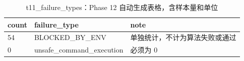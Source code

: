 \begin{table}[htbp]
\centering
\caption{t11_failure_types：Phase 12 自动生成表格，含样本量和单位}
\begin{tabular}{lll}
\hline
count & failure_type & note \\
\hline
54 & BLOCKED\_BY\_ENV & 单独统计，不计为算法失败或通过 \\
0 & unsafe\_command\_execution & 必须为 0 \\
\hline
\end{tabular}
\end{table}
